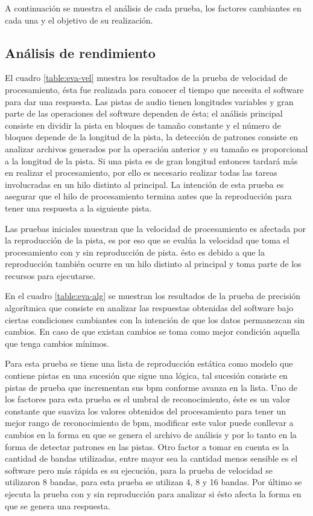 \noindent A continuaci\'on se muestra el an\'alisis de cada prueba, los factores cambiantes en cada una y el objetivo de su realizaci\'on.

\subsection{An\'alisis de rendimiento}

El cuadro \ref{table:eva-vel} muestra los resultados de la prueba de velocidad de procesamiento, \'esta fue realizada para conocer el tiempo que necesita el software para dar una respuesta. Las pistas de audio tienen longitudes variables y gran parte de las operaciones del software dependen de \'esta; el an\'alisis principal consiste en dividir la pista en bloques de tama\~no constante y el n\'umero de bloques depende de la longitud de la pista, la detecci\'on de patrones consiste en analizar archivos generados por la operaci\'on anterior  y su tama\~no es proporcional a la longitud de la pista. Si una pista es de gran longitud entonces tardar\'a m\'as en realizar el procesamiento, por ello es necesario realizar todas las tareas involucradas en un hilo distinto al principal. La intenci\'on de esta prueba es asegurar que el hilo de procesamiento termina antes que la reproducci\'on para tener una respuesta a la siguiente pista.

\noindent Las pruebas iniciales muestran que la velocidad de procesamiento es afectada por la reproducci\'on de la pista, es por eso que se eval\'ua la velocidad que toma el procesamiento con y sin reproducci\'on de pista. \'esto es debido a que la reproducci\'on tambi\'en ocurre en un hilo distinto al principal y toma parte de los recursos para ejecutarse.

\noindent En el cuadro \ref{table:eva-alg} se muestran los resultados de la prueba de precisi\'on algor\'itmica que consiste en analizar las respuestas obtenidas del software bajo ciertas condiciones cambiantes con la intenci\'on de que los datos permanezcan sin cambios. En caso de que existan cambios se toma como mejor condici\'on aquella que tenga cambios m\'inimos.

\noindent Para esta prueba se tiene una lista de reproducci\'on est\'atica como modelo que contiene pistas en una sucesi\'on que sigue una l\'ogica, tal sucesi\'on consiste en pistas de prueba que incrementan sus bpm conforme avanza en la lista. Uno de los factores para esta prueba es el umbral de reconocimiento, \'este es un valor constante que suaviza los valores obtenidos del procesamiento para tener un mejor rango de reconocimiento de bpm, modificar este valor puede conllevar a cambios en la forma en que se genera el archivo de an\'alisis y por lo tanto en la forma de detectar patrones en las pistas. Otro factor a tomar en cuenta es la cantidad de bandas utilizadas, entre mayor sea la cantidad menos sensible es el software pero m\'as r\'apida es su ejecuci\'on, para la prueba de velocidad se utilizaron 8 bandas, para esta prueba se utilizan 4, 8 y 16 bandas. Por \'ultimo se ejecuta la prueba con y sin reproducci\'on para analizar si \'esto afecta la forma en que se genera una respuesta.

